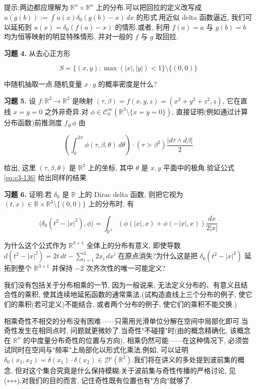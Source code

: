 提示:两边都应理解为 $\mathbb{R}^n\times\mathbb{R}^n$ 上的分布.可以把回拉的定义改写成 $u(g(b)) := \int u(x)\delta_0(g(b)-x)\, dx$ 的形式.用近似 delta 函数逼近, 我们可以延拓到 $u(x) = \delta_0(f(a)-x)$ 的情形.或者, 利用 $f(a) = a$ 与 $g(b) = b$ 均为恒等映射的明显特殊情形, 并对一般的 $f$ 与 $g$ 取回拉.

\textbf{习题 4.} 从去心正方形

\[
S = \{(x, y) : \max(|x|, |y|)<1\}\setminus\{(0, 0)\}
\]

中随机抽取一点.随机变量 $x\cdot y$ 的概率密度是什么?

\textbf{习题 5.} 设 $f : \mathbb{R}^3\to\mathbb{R}^2$ 是映射 $(\tau, \beta) = f(x, y, z) = (x^2+y^2+z^2, z)$, 它在直线 $x=y=0$ 之外非奇异.对 $\phi\in\mathcal{C}_0^{\infty}(\mathbb{R}^3\setminus\{x=y=0\})$, 直接证明(例如通过计算分布函数)前推测度 $f_{\#}\phi$ 由

\[
\left(\int_0^{2\pi}\phi(\tau, \beta, \theta)\, d\theta\right)\cdot(\tau>\beta^2)\frac{|d\tau\wedge d\beta|}{2}
\]

给出, 这里 $(\tau, \beta, \theta)$ 是 $\mathbb{R}^3$ 上的坐标, 其中 $\theta$ 是 $x, y$ 平面中的极角.验证公式 \eqref{eq:c3-136} 给出同样的结果.

\textbf{习题 6.} 证明:若 $\delta_0$ 是 $\mathbb{R}$ 上的 Dirac delta 函数, 则把它视为 $(t, x)\in\mathbb{R}\times\mathbb{R}^3\setminus\{(0, 0)\}$ 上的分布时, 有

\[
\langle\delta_0(t^2-|x|^2), \phi\rangle = \int_{\mathbb{R}^3}(\phi(|x|, x)+\phi(-|x|, x))\frac{dx}{2|x|}
\]

为什么这个公式作为 $\mathbb{R}^{3+1}$ 全体上的分布有意义, 即使导数 $d(t^2-|x|^2) = 2t\, dt - \sum_{i=1}^3 2x_i\, dx^i$ 在原点消失?为什么这是把 $\delta_0(t^2-|x|^2)$ 延拓到整个 $\mathbb{R}^{3+1}$ 并保持 $-2$ 次齐次性的唯一可能定义?


我们没有包括关于分布相乘的一节, 因为一般说来, 无法定义分布的、有意义且结合性的乘积, 使其连续地延拓函数的通常乘法.(试构造直线上三个分布的例子, 使它们的乘积(若可定义)不能结合, 或者两个分布的例子, 使它们的乘积不能交换.)

相乘奇性不相交的分布没有困难——只需用光滑单位分解在空间中局部化即可.当奇性发生在相同点时, 问题就更微妙了.当奇性"不碰撞"时(由的概念精确化, 该概念在 $\mathbb{R}^n$ 的中度量分布奇性的位置与方向), 相乘仍然可能——在这种情况下, 必须尝试同时在空间与"频率"上局部化以形式化乘法.例如, 可以证明 $\delta_0(x_1, x_2) = \delta(x_1)\cdot\delta(x_2)\in\mathcal{D}'(\mathbb{R}^2)$.我们将在讲义的多处提到波前集的概念, 但对这个集合究竟是什么保持模糊;关于波前集与奇性传播的严格讨论, 见(∗∗∗).对我们的目的而言, 记住奇性既有位置也有"方向"就够了.

